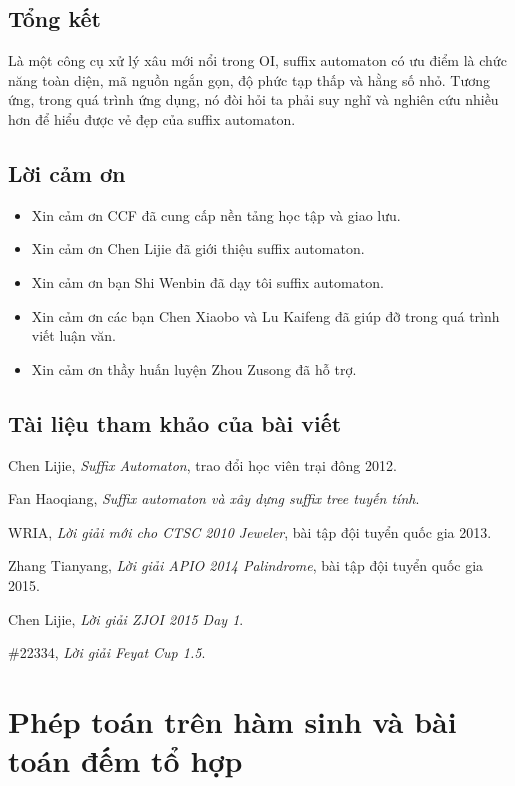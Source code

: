 \documentclass[11pt]{article}
\begin{document}
\subsection{Tổng kết}

Là một công cụ xử lý xâu mới nổi trong OI, suffix automaton có ưu điểm là chức
năng toàn diện, mã nguồn ngắn gọn, độ phức tạp thấp và hằng số nhỏ. Tương ứng,
trong quá trình ứng dụng, nó đòi hỏi ta phải suy nghĩ và nghiên cứu nhiều hơn
để hiểu được vẻ đẹp của suffix automaton.

\subsection{Lời cảm ơn}

\begin{itemize}
  \item Xin cảm ơn CCF đã cung cấp nền tảng học tập và giao lưu.
  \item Xin cảm ơn Chen Lijie đã giới thiệu suffix automaton.
  \item Xin cảm ơn bạn Shi Wenbin đã dạy tôi suffix automaton.
  \item Xin cảm ơn các bạn Chen Xiaobo và Lu Kaifeng đã giúp đỡ trong quá trình
  viết luận văn.
  \item Xin cảm ơn thầy huấn luyện Zhou Zusong đã hỗ trợ.
\end{itemize}

\subsection*{Tài liệu tham khảo của bài viết}

\begin{enumerate}[label={[\arabic*]},leftmargin=3em]
  \item Chen Lijie, \emph{Suffix Automaton}, trao đổi học viên trại đông 2012.
  \item Fan Haoqiang, \emph{Suffix automaton và xây dựng suffix tree tuyến tính}.
  \item WRIA, \emph{Lời giải mới cho CTSC 2010 Jeweler}, bài tập đội tuyển quốc
  gia 2013.
  \item Zhang Tianyang, \emph{Lời giải APIO 2014 Palindrome}, bài tập đội tuyển
  quốc gia 2015.
  \item Chen Lijie, \emph{Lời giải ZJOI 2015 Day 1}.
  \item \#22334, \emph{Lời giải Feyat Cup 1.5}.
\end{enumerate}

\section{Phép toán trên hàm sinh và bài toán đếm tổ hợp}
\end{document}

